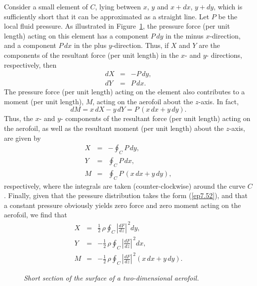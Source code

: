 Consider a small element of $C$, lying between $x$, $y$ and $x+dx$, $y+dy$, which is sufficiently
short that it can be approximated as a straight line. Let $P$ be the local fluid pressure. As illustrated
in Figure~\ref{fforce}, the pressure force (per unit length) acting on this element has a component $P\,dy$ in the minus
$x$-direction, and a component $P\,dx$ in the plus $y$-direction. Thus, if $X$ and $Y$ are the components of the
resultant force (per unit length) in the $x$- and $y$- directions, respectively, then
\begin{eqnarray}
dX &=&-P\,dy,\\[0.5ex]
dY&=&P\,dx.
\end{eqnarray}
The pressure force (per unit length) acting on the element also contributes to a moment (per unit length), $M$, acting
on the aerofoil about the $z$-axis. In fact,
\begin{equation}
dM = x\,dX-y\,dY = P\,(x\,dx+y\,dy).
\end{equation}
Thus, the $x$- and $y$- components of the resultant force (per unit length) acting on the aerofoil, as
well as the resultant moment (per unit length) about the $z$-axis, are given by
\begin{eqnarray}
X &=&-\oint_C P\,dy,\\[0.5ex]
Y&=&\oint_C P\,dx,\\[0.5ex]
M &=&\oint_C P\,(x\,dx+y\,dy),
\end{eqnarray}
respectively,
where the integrals are taken (counter-clockwise) around the curve $C$. Finally, given that the pressure distribution takes the
form (\ref{ep7.52}), and that a constant pressure obviously yields zero force and zero moment acting on the aerofoil, 
we find that
\begin{eqnarray}
X &=&\frac{1}{2}\,\rho\oint_C \left|\frac{dF}{dz}\right|^{\,2}dy,\\[0.5ex]
Y&=&-\frac{1}{2}\,\rho\oint_C \left|\frac{dF}{dz}\right|^{\,2}dx,\\[0.5ex]
M &=&-\frac{1}{2}\,\rho\oint_C \left|\frac{dF}{dz}\right|^{\,2}(x\,dx+y\,dy).
\end{eqnarray}

\begin{figure}
\epsfysize=3in
\centerline{}
\caption{\em Short section of the surface of a two-dimensional aerofoil.}\label{fforce}
\end{figure}

